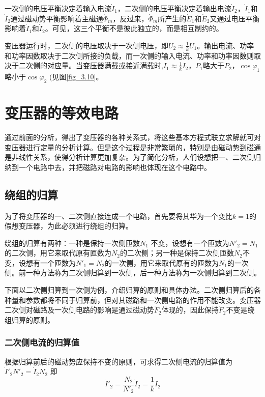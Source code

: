 \documentclass{book}
\begin{document}
一次侧的电压平衡决定着输入电流${{\dot{I}}_{1}}$，二次侧的电压平衡决定着输出电流${{\dot{I}}_{2}}$，${{\dot{I}}_{1}}$和${{\dot{I}}_{2}}$通过磁动势平衡影响着主磁通${{\dot{\Phi }}_{m}}$，反过来，${{\dot{\Phi }}_{m}}$所产生的${{\dot{E}}_{1}}$和${{\dot{E}}_{2}}$又通过电压平衡影响着${{\dot{I}}_{1}}$和${{\dot{I}}_{2}}$。可见，这三个平衡不是彼此独立的，而是相互制约的。

变压器运行时，二次侧的电压取决于一次侧电压，即${{U}_{2}}\approx \frac{1}{k}{{U}_{1}}$。输出电流、功率和功率因数取决于二次侧所接的负载，而一次侧的输入电流、功率和功率因数则取决于二次侧的对应量。当变压器满载或接近满载时,${{I}_{1}}\approx \frac{1}{k}{{I}_{2}}$，${{P}_{1}}$略大于${{P}_{2}}$，$\cos {{\varphi }_{1}}$略小于$\cos {{\varphi }_{2}}$ (见图\ref{fig_3.10}。


\section{变压器的等效电路}
通过前面的分析，得出了变压器的各种关系式，将这些基本方程式联立求解就可对变压器进行定量的分析计算。但是这个过程是非常繁琐的，特别是由磁动势到磁通是非线性关系，使得分析计算更加复杂。为了简化分析，人们设想把一、二次侧归纳到一个电路中去，并把磁路对电路的影响也体现在这个电路中。

\subsection{绕组的归算}
为了将变压器的一、二次侧直接连成一个电路，首先要将其华为一个变比$k=1$的假想变压器，为此必须进行绕组的归算。

绕组的归算有两种：一种是保持一次侧匝数${{N}_{1}}$ 不变，设想有一个匝数为${{{N}'}_{2}}={{N}_{1}}$的二次侧，用它来取代原有匝数为${{N}_{2}}$的二次侧；另一种是保持二次侧匝数${{N}_{2}}$不变，设想有一个匝数为${{{N}'}_{1}}={{N}_{2}}$的一次侧，用它来取代原有的匝数为${{N}_{1}}$的一次侧。前一种方法称为二次侧归算到一次侧，后一种方法称为一次侧归算到二次侧。

下面以二次侧归算到一次侧为例，介绍归算的原则和具体办法。二次侧归算后的各种量和参数都将不同于归算前，但对其磁路和一次侧电路的作用不能改变。变压器二次侧对磁路及一次侧电路的影响是通过磁动势${{\dot{F}}_{2}}$体现的，因此保持${{\dot{F}}_{2}}$不变是绕组归算的原则。

\subsubsection{二次侧电流的归算值}
根据归算前后的磁动势应保持不变的原则，可求得二次侧电流的归算值为
${{{\dot{I}}'}_{2}}{{{N}'}_{2}}={{\dot{I}}_{2}}{{N}_{2}}$
即
\begin{equation}
{{{\dot{I}}'}_{2}}=\frac{{{N}_{2}}}{{{{{N}'}}_{2}}}{{\dot{I}}_{2}}=\frac{1}{k}{{\dot{I}}_{2}}
\label{2-27}
\end{equation}
\end{document}
